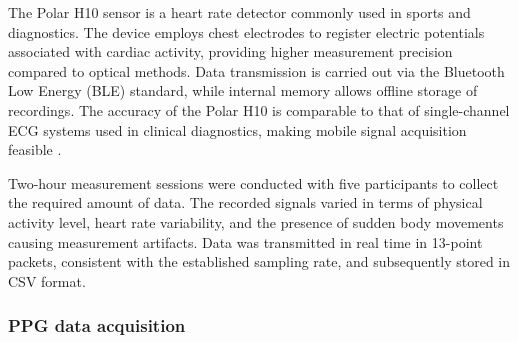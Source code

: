 \documentclass{citask}
\begin{document}
The Polar H10 sensor is a heart rate detector commonly used in sports and diagnostics. The device employs chest electrodes to register electric potentials associated with cardiac activity, providing higher measurement precision compared to optical methods. Data transmission is carried out via the Bluetooth Low Energy (BLE) standard, while internal memory allows offline storage of recordings. The accuracy of the Polar H10 is comparable to that of single-channel ECG systems used in clinical diagnostics, making mobile signal acquisition feasible \cite{21}.

Two-hour measurement sessions were conducted with five participants to collect the required amount of data. The recorded signals varied in terms of physical activity level, heart rate variability, and the presence of sudden body movements causing measurement artifacts. Data was transmitted in real time in 13-point packets, consistent with the established sampling rate, and subsequently stored in CSV format.


\subsubsection{PPG data acquisition}
\end{document}
